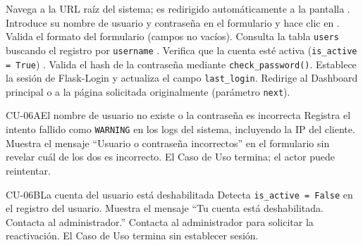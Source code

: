 \begin{UCtrayectoria}
	\UCpaso[\UCActor] Navega a la URL raíz del sistema; es redirigido automáticamente a la pantalla .
	\UCpaso[\UCActor] Introduce su nombre de usuario y contraseña en el formulario y hace clic en .
	\UCpaso[\UCsist] Valida el formato del formulario (campos no vacíos).
	\UCpaso[\UCsist] Consulta la tabla \texttt{users} buscando el registro por \texttt{username} .
	\UCpaso[\UCsist] Verifica que la cuenta esté activa (\texttt{is\_active = True}) .
	\UCpaso[\UCsist] Valida el hash de la contraseña mediante \texttt{check\_password()}.
	\UCpaso[\UCsist] Establece la sesión de Flask-Login y actualiza el campo \texttt{last\_login}.
	\UCpaso[\UCsist] Redirige al Dashboard principal  o a la página solicitada originalmente (parámetro \texttt{next}).
\end{UCtrayectoria}

\begin{UCtrayectoriaA}{CU-06}{A}{El nombre de usuario no existe o la contraseña es incorrecta}
	\UCpaso[\UCsist] Registra el intento fallido como \texttt{WARNING} en los logs del sistema, incluyendo la IP del cliente.
	\UCpaso[\UCsist] Muestra el mensaje ``Usuario o contraseña incorrectos'' en el formulario sin revelar cuál de los dos es incorrecto.
	\UCpaso[] El Caso de Uso termina; el actor puede reintentar.
\end{UCtrayectoriaA}

\begin{UCtrayectoriaA}{CU-06}{B}{La cuenta del usuario está deshabilitada}
	\UCpaso[\UCsist] Detecta \texttt{is\_active = False} en el registro del usuario.
	\UCpaso[\UCsist] Muestra el mensaje ``Tu cuenta está deshabilitada. Contacta al administrador.''
	\UCpaso[\UCActor] Contacta al administrador para solicitar la reactivación.
	\UCpaso[] El Caso de Uso termina sin establecer sesión.
\end{UCtrayectoriaA}
